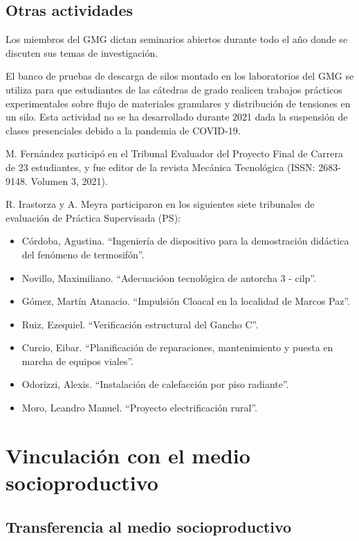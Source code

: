 \documentclass[a4paper,11pt,twoside,final,titlepage,onecolumn,openright]{report}
\begin{document}
\section{Otras actividades}

Los miembros del GMG dictan seminarios abiertos durante todo el año donde se discuten sus temas de investigación.

El banco de pruebas de descarga de silos montado en los laboratorios del GMG se utiliza para que estudiantes de las cátedras de grado realicen trabajos prácticos experimentales sobre flujo de materiales granulares y distribución de tensiones en un silo. Esta actividad no se ha desarrollado durante 2021 dada la suspensión de clases presenciales debido a la pandemia de COVID-19.

M. Fernández participó en el Tribunal Evaluador del Proyecto Final de Carrera de 23 estudiantes, y fue editor de la revista Mecánica Tecnológica (ISSN: 2683- 9148. Volumen 3, 2021). 

R. Irastorza y A. Meyra participaron en los siguientes siete tribunales de evaluación de Práctica Supervisada (PS):
\begin{itemize}
 \item Córdoba, Agustina. ``Ingeniería de dispositivo para la demostración didáctica del fenómeno de termosifón''.
 \item Novillo, Maximiliano. ``Adecuacióon tecnológica de antorcha 3 - cilp''.
\item Gómez, Martín Atanacio. ``Impulsión Cloacal en la localidad de Marcos Paz''.
\item Ruiz, Ezequiel. ``Verificación estructural del Gancho C''.
\item Curcio, Eibar. ``Planificación de reparaciones, mantenimiento y puesta en marcha de equipos viales''.
\item Odorizzi, Alexis. ``Instalación de calefacción por piso radiante''.
\item Moro, Leandro Manuel. ``Proyecto electrificación rural''.
\end{itemize}



\chapter{Vinculación con el medio socioproductivo}

\section{Transferencia al medio socioproductivo}
\end{document}
